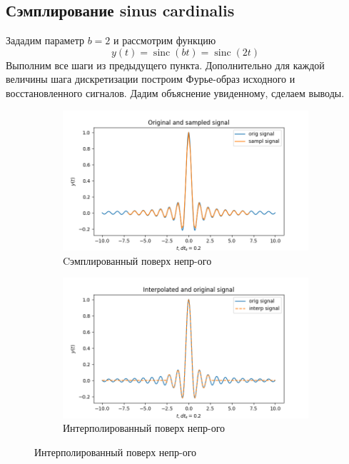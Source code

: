 \documentclass[a4paper, 12pt]{article}
\DeclareMathOperator{\sinc}{sinc}
\begin{document}
    \subsection{Сэмплирование sinus cardinalis}
    Зададим параметр $b=2$ и рассмотрим функцию $$y(t)=\sinc{(bt)}=\sinc{(2t)}$$
    Выполним все шаги из предыдущего пункта. Дополнительно для каждой величины
    шага дискретизации построим Фурье-образ исходного и
    восстановленного сигналов. Дадим объяснение увиденному, сделаем выводы.
    \begin{figure}[H]
        \centering
        \begin{subfigure}{0.45\textwidth}
            \centering
            \includegraphics[width=\linewidth]{1_sinc.png}
            \caption{Cэмплированный поверх непр-ого}
            \label{fig:sinc1}
        \end{subfigure}
        \hspace{5mm}
        \begin{subfigure}{0.45\textwidth}
            \centering
            \includegraphics[width=\linewidth]{1_isinc.png}
            \caption{Интерполированный поверх непр-ого}

\end{subfigure}
\end{figure}
\end{document}
